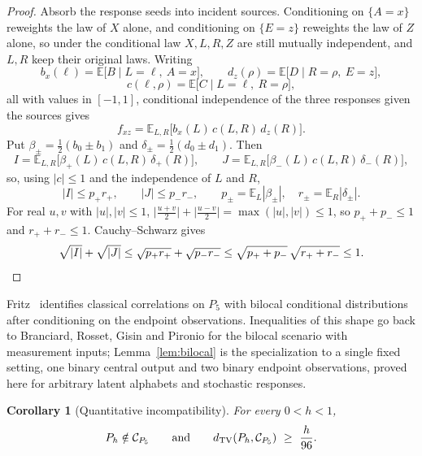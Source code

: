 \documentclass[11pt]{article}
\theoremstyle{plain}
\newtheorem{corollary}[theorem]{Corollary}
\theoremstyle{definition}
\DeclareMathOperator{\TV}{TV}
\newcommand{\E}{\mathbb E}
\begin{document}
\begin{proof}
Absorb the response seeds into incident sources. Conditioning on $\{A=x\}$ reweights the law of $X$ alone, and conditioning on $\{E=z\}$ reweights the law of $Z$ alone, so under the conditional law $X,L,R,Z$ are still mutually independent, and $L,R$ keep their original laws. Writing
\[
b_x(\ell)=\E\bigl[B\mid L=\ell,\ A=x\bigr],\qquad
d_z(\rho)=\E\bigl[D\mid R=\rho,\ E=z\bigr],
\]
\[
c(\ell,\rho)=\E\bigl[C\mid L=\ell,\ R=\rho\bigr],
\]
all with values in $[-1,1]$, conditional independence of the three responses given the sources gives
\[
f_{xz}=\E_{L,R}\bigl[b_x(L)\,c(L,R)\,d_z(R)\bigr].
\]
Put $\beta_\pm=\tfrac12(b_0\pm b_1)$ and $\delta_\pm=\tfrac12(d_0\pm d_1)$. Then
\[
I=\E_{L,R}\bigl[\beta_+(L)\,c(L,R)\,\delta_+(R)\bigr],\qquad
J=\E_{L,R}\bigl[\beta_-(L)\,c(L,R)\,\delta_-(R)\bigr],
\]
so, using $|c|\le1$ and the independence of $L$ and $R$,
\[
|I|\le p_+r_+,\qquad |J|\le p_-r_-,\qquad
p_\pm=\E_L|\beta_\pm|,\quad r_\pm=\E_R|\delta_\pm| .
\]
For real $u,v$ with $|u|,|v|\le1$,
$\bigl|\tfrac{u+v}2\bigr|+\bigl|\tfrac{u-v}2\bigr|=\max(|u|,|v|)\le1$,
so $p_++p_-\le1$ and $r_++r_-\le1$. Cauchy--Schwarz gives
\[
\sqrt{|I|}+\sqrt{|J|}\le\sqrt{p_+r_+}+\sqrt{p_-r_-}\le\sqrt{p_++p_-}\,\sqrt{r_++r_-}\le1 . \qedhere
\]
\end{proof}

Fritz~\cite[Theorem~2.9]{Fritz2012} identifies classical correlations on $P_5$ with bilocal conditional distributions after conditioning on the endpoint observations. Inequalities of this shape go back to Branciard, Rosset, Gisin and Pironio \cite{BranciardRossetGisinPironio2012} for the bilocal scenario with measurement inputs; Lemma~\ref{lem:bilocal} is the specialization to a single fixed setting, one binary central output and two binary endpoint observations, proved here for arbitrary latent alphabets and stochastic responses.

\begin{corollary}[Quantitative incompatibility]\label{cor:pathdistance}
For every $0<h<1$,
\[
P_h\notin\Cpath\qquad\text{and}\qquad d_{\TV}(P_h,\Cpath)\ \ge\ \frac h{96}.
\]
\end{corollary}
\end{document}

